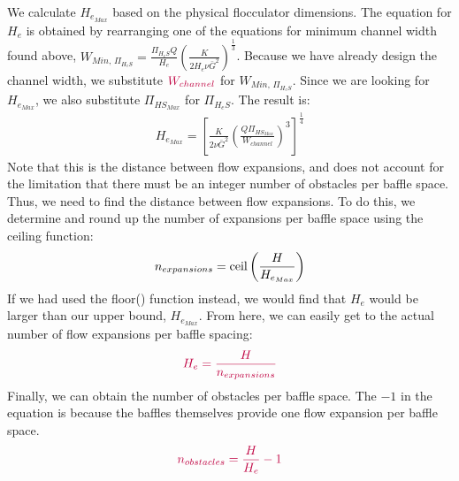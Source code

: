 \documentclass[letterpaper,10pt,english]{sphinxmanual}
\begin{document}
We calculate \(H_{e_{Max}}\) based on the physical flocculator dimensions. The equation for \(H_e\) is obtained by rearranging one of the equations for minimum channel width found above, \(W_{Min, \, \Pi_{H_eS}} = \frac{\Pi_{H_eS}Q}{H_e}\left( \frac{K}{2 H_e \nu \bar G^2} \right)^\frac{1}{3}\). Because we have already design the channel width, we substitute \(\color{purple}{W_{channel}}\) for \(W_{Min, \, \Pi_{H_eS}}\). Since we are looking for \(H_{e_{Max}}\), we also substitute \(\Pi_{{HS}_{Max}}\) for \(\Pi_{H_eS}\). The result is:
\begin{equation}\label{equation:Flocculation/Floc_Design:Flocculation/Floc_Design:30}
\begin{split}H_{e_{Max}} = \left[ \frac{K}{2 \nu \bar G^2} \left( \frac{Q \Pi_{{HS}_{Max}}}{W_{channel}} \right)^3 \right]^\frac{1}{4}\end{split}
\end{equation}
Note that this is the  distance between flow expansions, and does not account for the limitation that there must be an integer number of obstacles per baffle space. Thus, we need to find the  distance between flow expansions. To do this, we determine and round up the number of expansions per baffle space using the ceiling function:
\begin{equation}\label{equation:Flocculation/Floc_Design:Flocculation/Floc_Design:31}
\begin{split}n_{expansions} = {\rm ceil}\left( \frac{H}{H_{e_{Max}}} \right)\end{split}
\end{equation}
If we had used the floor() function instead, we would find that \(H_e\) would be larger than our upper bound, \(H_{e_{Max}}\). From here, we can easily get to the actual number of flow expansions per baffle spacing:
\begin{equation}\label{equation:Flocculation/Floc_Design:Flocculation/Floc_Design:32}
\begin{split}\color{purple}{
  H_e = \frac{H}{n_{expansions}}
  }\end{split}
\end{equation}
Finally, we can obtain the number of obstacles per baffle space. The \(- 1\) in the equation is because the baffles themselves provide one flow expansion per baffle space.
\begin{equation}\label{equation:Flocculation/Floc_Design:Flocculation/Floc_Design:33}
\begin{split}\color{purple}{
  n_{obstacles} = \frac{H}{H_e} - 1
  }\end{split}
\end{equation}
\end{document}
